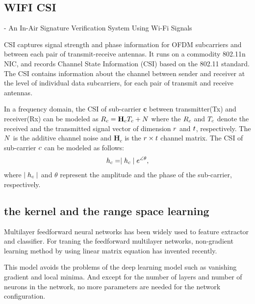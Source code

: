 \documentclass[runningheads]{llncs}
\begin{document}
\subsection{WIFI CSI}
- An In-Air Signature Verification System Using Wi-Fi Signals 

CSI captures signal strength and phase information for OFDM subcarriers and between each pair of transmit-receive antennas.
It runs on a commodity 802.11n NIC, and records Channel State Information (CSI) based on the 802.11 standard.
The CSI contains information about the channel between sender and receiver at the level of individual data subcarriers, for each pair of transmit and receive antennas.

In a frequency domain, the CSI of sub-carrier $\mathbf{c}$ between transmitter(Tx) and receiver(Rx) can be modeled as 
$\mathnormal{R}_{c} = \mathbf{H}_{c}\mathnormal{T}_{c} +\mathnormal{N}$ where the $\mathnormal{R}_{c}$ and $\mathnormal{T}_{c}$  denote the received and the transmitted signal vector of dimension $\mathnormal{r}$ and $\mathnormal{t}$, respectively. The $\mathnormal{N}$ is the additive channel noise and $\mathbf{H}_{c}$ is the $\mathnormal{r}\times\mathnormal{t}$ channel matrix. The CSI of sub-carrier $\mathnormal{c}$ can be modeled as follows:
\begin{equation}
    \mathnormal{h}_{c} = \mid\mathnormal{h}_{c}\mid\mathnormal{e}^{\angle\theta},
\end{equation}
where $\mid\mathnormal{h}_{c}\mid$ and $\theta$ represent the amplitude and the phase of the sub-carrier, respectively.

\subsection{the kernel and the range space learning}

Multilayer feedforward neural networks has been widely used to feature extractor and classifier.
For traning the feedforward multilayer networks, non-gradient learning method by using linear matrix equation has invented recently. \cite{wang2018review}

This model avoids the problems of the deep learning model such as vanishing gradient and local minima. And except for the number of layers and number of neurons in the network, no more parameters are needed for the network configuration.
\end{document}
